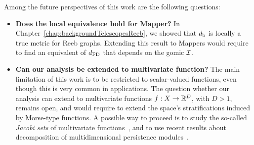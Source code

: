Among the future perspectives of this work are the following questions:
\begin{itemize}

\item {\bf Does the local equivalence hold for Mapper?} In Chapter~\ref{chap:backgroundTelescopesReeb}, we showed that $d_{\rm b}$ is locally a true metric for Reeb graphs.
Extending this result to Mappers would require to find an equivalent of $d_{\rm FD}$ that depends on the gomic $\mathcal{I}$. 

\item {\bf Can our analysis be extended to multivariate function?} The main limitation of this work is to be restricted to scalar-valued functions, even though this is very common in applications.
The question whether our analysis can extend to multivariate functions $f:X\rightarrow\mathbb{R}^D$, with $D>1$, remains open, and
would require to extend the space's stratifications induced by Morse-type functions. A possible way to proceed is to study the so-called {\em Jacobi sets}
of multivariate functions~\cite{Chattopadhyay16, Edelsbrunner02a, Edelsbrunner08, Tierny17}, and to use recent results about 
decomposition of multidimensional persistence modules~\cite{Botnan16, Cochoy16}.  
\end{itemize}


%
%
